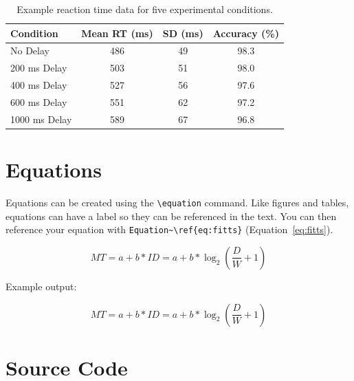 \begin{table}[ht]
\centering
\begin{tabular}{lccc}
\toprule
Condition & Mean RT (ms) & SD (ms) & Accuracy (\%)\\
\midrule
No Delay & 486 & 49 & 98.3\\
200 ms Delay & 503 & 51 & 98.0\\
400 ms Delay & 527 & 56 & 97.6\\
600 ms Delay & 551 & 62 & 97.2\\
1000 ms Delay & 589 & 67 & 96.8\\
\bottomrule
\end{tabular}
\caption{Example reaction time data for five experimental conditions.}
\label{tab:example}
\end{table}



\section{Equations}

Equations can be created using the \texttt{\textbackslash equation} command. Like figures and tables, equations can have a label so they can be referenced in the text. You can then reference your equation with \texttt{Equation\textasciitilde\textbackslash ref\{eq:fitts\}} (Equation~\ref{eq:fitts}).

\begin{listing}[H]
\begin{code}
\begin{equation}
MT = a + b * ID = a + b * \log_2\left(\frac{D}{W}+1\right)
\label{eq:fitts}
\end{equation}
\end{code}
\caption{Creating an equation}
\end{listing}

Example output:

\begin{equation}
MT = a + b * ID = a + b * \log_2\left(\frac{D}{W}+1\right)
\label{eq:fitts}
\end{equation}


\section{Source Code}

